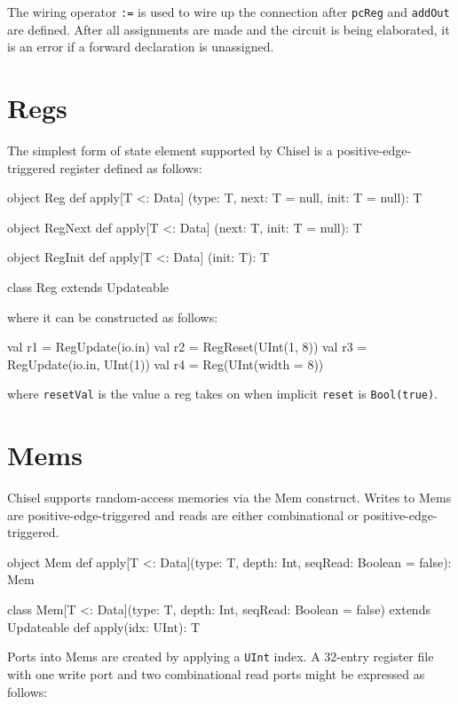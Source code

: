 \documentclass[10pt,twocolumn]{article}
\def\code#1{{\small\tt #1}}
\begin{document}
\noindent
The wiring operator
\verb!:=! is used to wire up
the connection after \verb!pcReg! and \verb!addOut! are defined.
After all assignments are made and the circuit is being elaborated, 
it is an error if a forward declaration is unassigned.

\section{Regs}

The simplest form of state element supported by Chisel is a
positive-edge-triggered register defined as follows:

\begin{scala}
object Reg {
  def apply[T <: Data]
    (type: T, next: T = null, init: T = null): T
}
 
object RegNext {
  def apply[T <: Data] (next: T, init: T = null): T
}

object RegInit {
  def apply[T <: Data] (init: T): T
}

class Reg extends Updateable
\end{scala}

\noindent
where it can be constructed as follows:

\begin{scala}
val r1 = RegUpdate(io.in)
val r2 = RegReset(UInt(1, 8))
val r3 = RegUpdate(io.in, UInt(1))
val r4 = Reg(UInt(width = 8))
\end{scala}

\noindent
where \code{resetVal} is the value a reg takes on when implicit
\code{reset} is \code{Bool(true)}.

\section{Mems}

Chisel supports random-access memories via the Mem construct.  Writes to Mems
are positive-edge-triggered and reads are either combinational or
positive-edge-triggered.  

\begin{scala}
object Mem {
  def apply[T <: Data](type: T, depth: Int, 
          seqRead: Boolean = false): Mem
}

class Mem[T <: Data](type: T, depth: Int, 
      seqRead: Boolean = false)
    extends Updateable {
  def apply(idx: UInt): T
}
\end{scala}

Ports into Mems are created by applying a \code{UInt} index.  A 32-entry
register file with one write port and two combinational read ports might be
expressed as follows:
\end{document}
